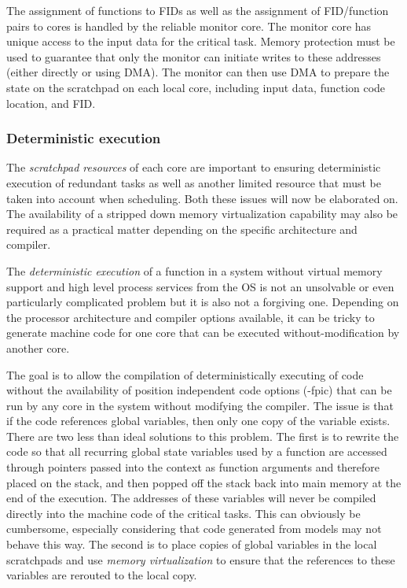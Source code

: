 The assignment of functions to FIDs as well as the assignment of FID/function pairs to cores is handled by the reliable monitor core. The monitor core has unique access to the input data for the critical task. Memory protection must be used to guarantee that only the monitor can initiate writes to these addresses (either directly or using DMA). The monitor can then use DMA to prepare the state on the scratchpad on each local core, including input data, function code location, and FID. 

\subsubsection{Deterministic execution}

The \emph{scratchpad resources} of each core are important to ensuring deterministic execution of redundant tasks as well as another limited resource that must be taken into account when scheduling. Both these issues will now be elaborated on. The availability of a stripped down memory virtualization capability may also be required as a practical matter depending on the specific architecture and compiler. 

The \emph{deterministic execution} of a function in a system without virtual memory support and high level process services from the OS is not an unsolvable or even particularly complicated problem but it is also not a forgiving one. Depending on the processor architecture and compiler options available, it can be tricky to generate machine code for one core that can be executed without-modification by another core.

The goal is to allow the compilation of deterministically executing of code without the availability of position independent code options (-fpic) that can be run by any core in the system without modifying the compiler. The issue is that if the code references global variables, then only one copy of the variable exists. There are two less than ideal solutions to this problem. The first is to rewrite the code so that all recurring global state variables used by a function are accessed through pointers passed into the context as function arguments and therefore placed on the stack, and then popped off the stack back into main memory at the end of the execution. The addresses of these variables will never be compiled directly into the machine code of the critical tasks. This can obviously be cumbersome, especially considering that code generated from models may not behave this way. The second is to place copies of global variables in the local scratchpads and use \emph{memory virtualization} to ensure that the references to these variables are rerouted to the local copy.

